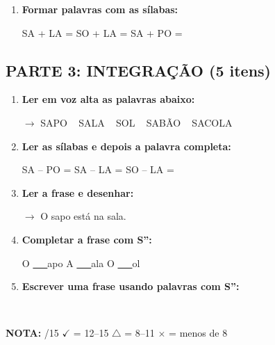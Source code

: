 \begin{exercicio}
\begin{enumerate}[resume]
  \item \textbf{Formar palavras com as sílabas:}
  \begin{center}
  SA + LA = \underline{\hspace{2cm}} \quad SO + LA = \underline{\hspace{2cm}} \quad SA + PO = \underline{\hspace{2cm}}
  \end{center}
\end{enumerate}

\subsection*{PARTE 3: INTEGRAÇÃO (5 itens)}

\begin{enumerate}[resume]
  \item \textbf{Ler em voz alta as palavras abaixo:}
  \begin{center}
  $\rightarrow$ SAPO  ~  SALA  ~  SOL  ~  SABÃO  ~  SACOLA
  \end{center}

  \item \textbf{Ler as sílabas e depois a palavra completa:}
  \begin{center}
  SA -- PO = \underline{\hspace{2cm}} \quad SA -- LA = \underline{\hspace{2cm}} \quad SO -- LA = \underline{\hspace{2cm}}
  \end{center}

  \item \textbf{Ler a frase e desenhar:}
  \begin{center}
  $\rightarrow$ O sapo está na sala.
  \end{center}
  \begin{center}
  \end{center}

  \item \textbf{Completar a frase com S'':}
  \begin{center}
  O \underline{~~~}apo \quad A \underline{~~~}ala \quad O \underline{~~~}ol
  \end{center}

  \item \textbf{Escrever uma frase usando palavras com S'':}
  \begin{center}
  \underline{\hspace{12cm}} \\
  \underline{\hspace{12cm}}
  \end{center}
\end{enumerate}

\noindent\textbf{NOTA:} \underline{\hspace{1cm}}/15 \quad $\checkmark$ = 12--15 \quad $\triangle$ = 8--11 \quad $\times$ = menos de 8
\end{exercicio}

